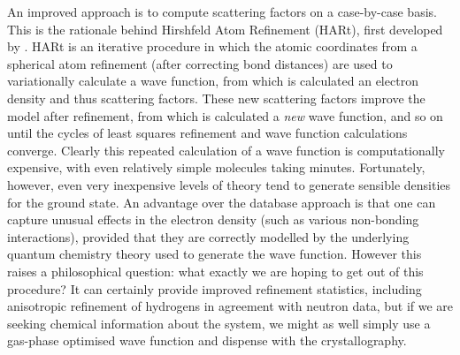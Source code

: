 \begin{refsection}
An improved approach is to compute scattering factors on a case-by-case basis.
This is the rationale behind Hirshfeld Atom Refinement (HARt), first developed by \citeauthor{Jayatilaka2008}.\autocite{Jayatilaka2008}
HARt is an iterative procedure in which the atomic coordinates from a spherical atom refinement (after correcting  bond distances) are used to variationally calculate a wave function, from which is calculated an electron density and thus scattering factors.
These new scattering factors improve the model after refinement, from which is calculated a \emph{new} wave function, and so on until the cycles of least squares refinement and wave function calculations converge.
Clearly this repeated calculation of a wave function is computationally expensive, with even relatively simple molecules taking minutes.
Fortunately, however, even very inexpensive levels of theory tend to generate sensible densities for the ground state.
An advantage over the database approach is that one can capture unusual effects in the electron density (such as various non-bonding interactions), provided that they are correctly modelled by the underlying quantum chemistry theory used to generate the wave function.
However this raises a philosophical question: what exactly we are hoping to get out of this procedure?
It can certainly provide improved refinement statistics, including anisotropic refinement of hydrogens in agreement with neutron data, but if we are seeking chemical information about the system, we might as well simply use a gas-phase optimised wave function and dispense with the crystallography.


\end{refsection}
